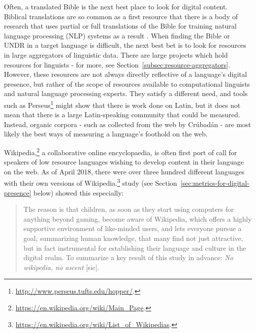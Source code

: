 Often, a translated Bible is the next best place to look for digital content. Biblical translations are so common as a first resource that there is a body of research that uses partial or full translations of the Bible for training natural language processing (NLP) systems as a result \citep{chew2006evaluation, agic2015if}. When finding the Bible or UNDR in a target language is difficult, the next best bet is to look for resources in large aggregators of linguistic data. There are large projects which hold resources for linguists - for more, see Section~\ref{subsec:resource-aggregators}. However, these resources are not always directly reflective of a language's digital presence, but rather of the scope of resources available to computational linguists and natural language processing experts. They satisfy a different need, and tools such as Perseus\footnote{\href{http://www.perseus.tufts.edu/hopper/}{http://www.perseus.tufts.edu/hopper/}. } might show that there is work done on Latin, but it does not mean that there is a large Latin-speaking community that could be measured. Instead, organic corpora - such as collected from the web by Cr\'ubad\'an - are most likely the best ways of measuring a language's foothold on the web.

Wikipedia,\footnote{\href{https://en.wikipedia.org/wiki/Main_Page}{https://en.wikipedia.org/wiki/Main\_Page}. } a collaborative online encyclopaedia, is often first port of call for speakers of low resource languages wishing to develop content in their language on the web. As of April 2018, there were over three hundred different languages with their own versions of Wikipedia.\footnote{\href{https://en.wikipedia.org/wiki/List_of_Wikipedias}{https://en.wikipedia.org/wiki/List\_of\_Wikipedias}. }  study (see Section~\ref{sec:metrics-for-digital-presence} below) showed this especially:

\begin{quote}
The reason is that children, as soon as they start using computers for anything beyond gaming, become aware of Wikipedia, which offers a highly supportive environment of like-minded users, and lets everyone pursue a goal, summarizing human knowledge, that many find not just attractive, but in fact instrumental for establishing their language and culture in the digital realm. To summarize a key result of this study in advance: \emph{No wikipedia, no ascent} [sic]. \citep{kornai2013digital}
\end{quote}

